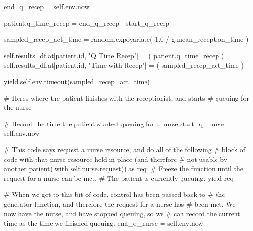 \documentclass[
  letterpaper,
  DIV=11,
  numbers=noendperiod]{scrreprt}
\newenvironment{Shaded}{\begin{snugshade}}{\end{snugshade}}
\newcommand{\BuiltInTok}[1]{\textcolor[rgb]{0.00,0.23,0.31}{#1}}
\newcommand{\CommentTok}[1]{\textcolor[rgb]{0.37,0.37,0.37}{#1}}
\newcommand{\ControlFlowTok}[1]{\textcolor[rgb]{0.00,0.23,0.31}{#1}}
\newcommand{\FloatTok}[1]{\textcolor[rgb]{0.68,0.00,0.00}{#1}}
\newcommand{\ImportTok}[1]{\textcolor[rgb]{0.00,0.46,0.62}{#1}}
\newcommand{\NormalTok}[1]{\textcolor[rgb]{0.00,0.23,0.31}{#1}}
\newcommand{\OperatorTok}[1]{\textcolor[rgb]{0.37,0.37,0.37}{#1}}
\newcommand{\StringTok}[1]{\textcolor[rgb]{0.13,0.47,0.30}{#1}}
\newcommand{\VariableTok}[1]{\textcolor[rgb]{0.07,0.07,0.07}{#1}}
\begin{document}
\begin{tcolorbox}
\begin{Shaded}
\begin{Highlighting}[]
\NormalTok{            end\_q\_recep }\OperatorTok{=} \VariableTok{self}\NormalTok{.env.now}

\NormalTok{            patient.q\_time\_recep }\OperatorTok{=}\NormalTok{ end\_q\_recep }\OperatorTok{{-}}\NormalTok{ start\_q\_recep}

\NormalTok{            sampled\_recep\_act\_time }\OperatorTok{=}\NormalTok{ random.expovariate(}
                \FloatTok{1.0} \OperatorTok{/}\NormalTok{ g.mean\_reception\_time}
\NormalTok{            )}

            \VariableTok{self}\NormalTok{.results\_df.at[patient.}\BuiltInTok{id}\NormalTok{, }\StringTok{"Q Time Recep"}\NormalTok{] }\OperatorTok{=}\NormalTok{ (}
\NormalTok{                 patient.q\_time\_recep}
\NormalTok{            )}
            \VariableTok{self}\NormalTok{.results\_df.at[patient.}\BuiltInTok{id}\NormalTok{, }\StringTok{"Time with Recep"}\NormalTok{] }\OperatorTok{=}\NormalTok{ (}
\NormalTok{                 sampled\_recep\_act\_time}
\NormalTok{            )}

            \ControlFlowTok{yield} \VariableTok{self}\NormalTok{.env.timeout(sampled\_recep\_act\_time)}

        \CommentTok{\# Here\textquotesingle{}s where the patient finishes with the receptionist, and starts}
        \CommentTok{\# queuing for the nurse}

        \CommentTok{\# Record the time the patient started queuing for a nurse}
\NormalTok{        start\_q\_nurse }\OperatorTok{=} \VariableTok{self}\NormalTok{.env.now}

        \CommentTok{\# This code says request a nurse resource, and do all of the following}
        \CommentTok{\# block of code with that nurse resource held in place (and therefore}
        \CommentTok{\# not usable by another patient)}
        \ControlFlowTok{with} \VariableTok{self}\NormalTok{.nurse.request() }\ImportTok{as}\NormalTok{ req:}
            \CommentTok{\# Freeze the function until the request for a nurse can be met.}
            \CommentTok{\# The patient is currently queuing.}
            \ControlFlowTok{yield}\NormalTok{ req}

            \CommentTok{\# When we get to this bit of code, control has been passed back to}
            \CommentTok{\# the generator function, and therefore the request for a nurse has}
            \CommentTok{\# been met.  We now have the nurse, and have stopped queuing, so we}
            \CommentTok{\# can record the current time as the time we finished queuing.}
\NormalTok{            end\_q\_nurse }\OperatorTok{=} \VariableTok{self}\NormalTok{.env.now}


\end{Highlighting}
\end{Shaded}
\end{tcolorbox}
\end{document}
